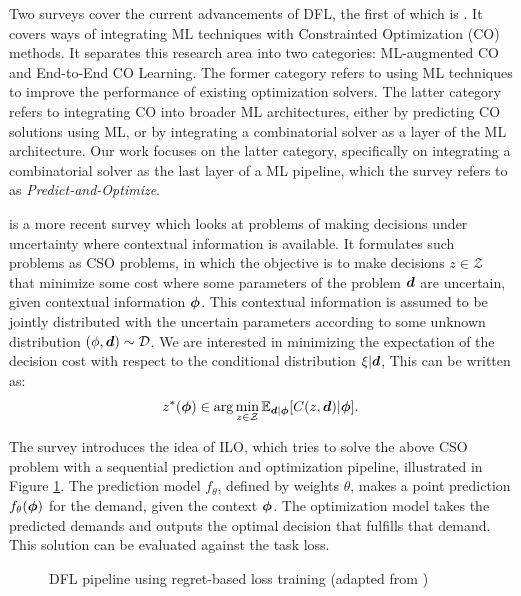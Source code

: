 Two surveys cover the current advancements of DFL, the first of which is \cite{kotaryEndtoEndConstrainedOptimization2021}. It covers ways of integrating ML techniques with Constrainted Optimization (CO) methods. It separates this research area into two categories: ML-augmented CO and End-to-End CO Learning. The former category refers to using ML techniques to improve the performance of existing optimization solvers. The latter category refers to integrating CO into broader ML architectures, either by predicting CO solutions using ML, or by integrating a combinatorial solver as a layer of the ML architecture. Our work focuses on the latter category, specifically on integrating a combinatorial solver as the last layer of a ML pipeline, which the survey refers to as \textit{Predict-and-Optimize}.

\cite{sadanaSurveyContextualOptimization2023} is a more recent survey which looks at problems of making decisions under uncertainty where contextual information is available. It formulates such problems as CSO problems, in which the objective is to make decisions $z \in \mathcal{Z}$ that minimize some cost  where some parameters of the problem ${\bm{d}}$ are uncertain, given contextual information ${\bm{\phi}}$. This contextual information is assumed to be jointly distributed with the uncertain parameters according to some unknown distribution $(\phi, {\bm{d}}) \sim \mathcal{D}$. We are interested in minimizing the expectation of the decision cost with respect to the conditional distribution $\xi | {\bm{d}}$, This can be written as:
\begin{equation} \label{eq:litrev:cso}
    z^*({\bm{\phi}}) \in \arg\min_{z\in \mathcal{Z}} \mathbb{E}_{{\bm{d}}|{\bm{\phi}}}[C(z, {\bm{d}}) | {\bm{\phi}}].
\end{equation}

The survey introduces the idea of ILO, which tries to solve the above CSO problem with a sequential prediction and optimization pipeline, illustrated in Figure \ref{fig:litrev:dfl-pipeline}. The prediction model $f_\theta$, defined by weights $\theta$, makes a point prediction $f_\theta({\bm{\phi}})$ for the demand, given the context ${\bm{\phi}}$. The optimization model takes the predicted demands and outputs the optimal decision that fulfills that demand. This solution can be evaluated against the task loss. 
\begin{figure}[hb]
    \centering
    
    \caption{DFL pipeline using regret-based loss training (adapted from \cite{sadanaSurveyContextualOptimization2023})}
    \label{fig:litrev:dfl-pipeline}
\end{figure}

